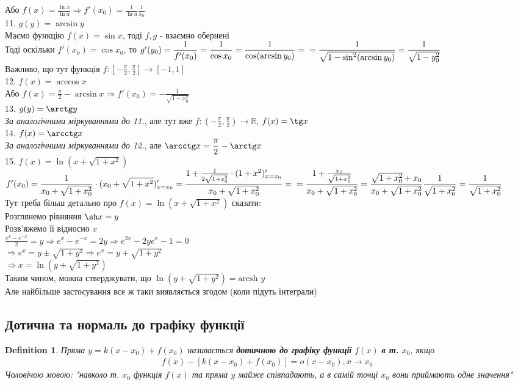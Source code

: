 \documentclass[a4paper, 14pt]{extarticle}
\def\huge{\displaystyle}
\def\bigline{\vspace{5mm}\\}
\theoremstyle{theoremdd}
\theoremstyle{theoremdd}
\newtheorem{definition}[theorem]{Definition}
\theoremstyle{theoremdd}
\theoremstyle{theoremdd}
\theoremstyle{theoremdd}
\theoremstyle{theoremdd}
\theoremstyle{theoremdd}
\theoremstyle{theoremdd}
\begin{document}
Або $f(x) = \huge \frac{\ln x}{\ln a} \Rightarrow f'(x_0) = \frac{1}{\ln a} \frac{1}{x_0}$
\bigline
11. $g(y) = \arcsin y$\\
Маємо функцію $f(x) = \sin x$, тоді $f,g$ - взаємно обернені\\
Тоді оскільки $f'(x_0) = \cos x_0$, то $g'(y_0) = \huge \frac{1}{f'(x_0)} = \frac{1}{\cos x_0}= \frac{1}{\cos (\arcsin y_0)} = \\ = \frac{1}{\sqrt{1- \sin^2(\arcsin y_0)}} = \frac{1}{\sqrt{1-y_0^2}}$\\
Важливо, що тут функція $f: \huge \left[-\frac{\pi}{2},\frac{\pi}{2}\right] \to [-1,1]$
\bigline
12. $f(x) = \arccos x$\\
Або $f(x) = \huge \frac{\pi}{2} - \arcsin x \Rightarrow f'(x_0) = - \frac{1}{\sqrt{1-x_0^2}}$
\bigline
13. $g(y) = \arctg y$\\
\textit{За аналогічними міркуваннями до 11.}, але тут вже $f: \huge \left(-\frac{\pi}{2},\frac{\pi}{2}\right) \to \mathbb{R}$, $f(x) = \tg x$
\bigline
14. $f(x) = \arcctg x$\\
\textit{За аналогічними міркуваннями до 12.}, але $\arcctg x = \huge \frac{\pi}{2} - \arctg x$
\bigline
15. $f(x) = \ln(x + \sqrt{1+x^2})$\\
$f'(x_0) = \huge \frac{1}{x_0+ \sqrt{1+x_0^2}} \cdot (x_0+ \sqrt{1+x^2})'_{x = x_0} = \frac{1+ \frac{1}{2\sqrt{1+x_0^2}} \cdot (1+x^2)'_{x=x_0}}{x_0+ \sqrt{1+x_0^2}} = \\ = \frac{1+ \frac{x_0}{\sqrt{1+x_0^2}}}{x_0 + \sqrt{1+x_0^2}} = \frac{\sqrt{1+x_0^2}+x_0}{x_0 + \sqrt{1 + x_0^2}} \frac{1}{\sqrt{1+x_0^2}} = \frac{1}{\sqrt{1+x_0^2}}$
\bigline
\rm{} Тут треба більш детально про $f(x) = \ln(x+\sqrt{1+x^2})$ сказати:\\
Розглянемо рівняння $\sh x = y$\\
Розв'яжемо її відносно $x$\\
$\huge \frac{e^x-e^{-x}}{2} = y \Rightarrow e^x-e^{-x}=2y \Rightarrow e^{2x}- 2y e^x - 1 = 0$\\
$\Rightarrow e^x = y \pm \sqrt{1+y^2} \Rightarrow e^x = y + \sqrt{1+y^2}$\\
$\Rightarrow x = \ln(y + \sqrt{1+y^2})$\\
Таким чином, можна стверджувати, що $\ln(y+\sqrt{1+y^2}) = \textrm{arcsh } y$\\
Але найбільше застосування все ж таки виявляється згодом (коли підуть інтеграли)
\bigline

\subsection{Дотична та нормаль до графіку функції}
\begin{definition}
Пряма $y = k (x-x_0) + f(x_0)$ називається \textbf{дотичною до графіку функції} $f(x)$ \textbf{в т.} $x_0$, якщо
\begin{align*}
f(x) - [k(x-x_0)+f(x_0)] = o(x-x_0), x\to x_0
\end{align*}
Чоловічою мовою: "навколо т. $x_0$ функція $f(x)$ та пряма $y$ майже співпадають, а в самій точці $x_0$ вони приймають одне значення"
\end{definition}
\end{document}
